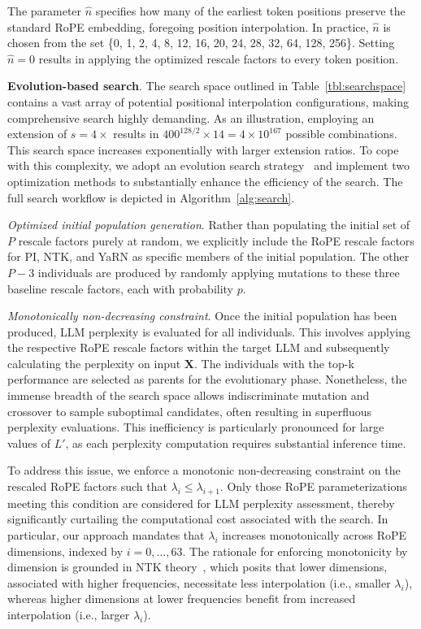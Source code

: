 The parameter $\hat{n}$ specifies how many of the earliest token positions preserve the standard RoPE embedding, foregoing position interpolation. In practice, $\hat{n}$ is chosen from the set \{0, 1, 2, 4, 8, 12, 16, 20, 24, 28, 32, 64, 128, 256\}. Setting $\hat{n}=0$ results in applying the optimized rescale factors to every token position.

\textbf{Evolution-based search}. The search space outlined in Table~\ref{tbl:searchspace} contains a vast array of potential positional interpolation configurations, making comprehensive search highly demanding. As an illustration, employing an extension of $s=4\times$ results in $400^{128/2}\times14 = 4\times10^{167}$ possible combinations. This search space increases exponentially with larger extension ratios. To cope with this complexity, we adopt an evolution search strategy~\cite{guo2020single} and implement two optimization methods to substantially enhance the efficiency of the search. The full search workflow is depicted in Algorithm~\ref{alg:search}.

\textit{Optimized initial population generation}. Rather than populating the initial set of $P$ rescale factors purely at random, we explicitly include the RoPE rescale factors for PI, NTK, and YaRN as specific members of the initial population. The other $P-3$ individuals are produced by randomly applying mutations to these three baseline rescale factors, each with probability $p$.

\textit{Monotonically non-decreasing constraint}. Once the initial population has been produced, LLM perplexity is evaluated for all individuals. This involves applying the respective RoPE rescale factors within the target LLM and subsequently calculating the perplexity on input $\mathbf{X}$. The individuals with the top-k performance are selected as parents for the evolutionary phase. Nonetheless, the immense breadth of the search space allows indiscriminate mutation and crossover to sample suboptimal candidates, often resulting in superfluous perplexity evaluations. This inefficiency is particularly pronounced for large values of $L'$, as each perplexity computation requires substantial inference time.

To address this issue, we enforce a monotonic non-decreasing constraint on the rescaled RoPE factors such that $\lambda_i \leq \lambda_{i+1}$. Only those RoPE parameterizations meeting this condition are considered for LLM perplexity assessment, thereby significantly curtailing the computational cost associated with the search. In particular, our approach mandates that $\lambda_i$ increases monotonically across RoPE dimensions, indexed by $i=0,\ldots,63$. The rationale for enforcing monotonicity by dimension is grounded in NTK theory~\cite{jacot2018neural,tancik2020fourier,ntk}, which posits that lower dimensions, associated with higher frequencies, necessitate less interpolation (i.e., smaller $\lambda_i$), whereas higher dimensions at lower frequencies benefit from increased interpolation (i.e., larger $\lambda_i$).

